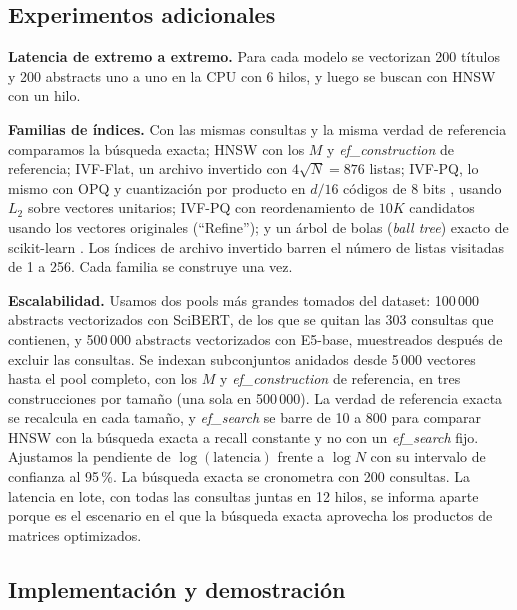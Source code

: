 \documentclass[runningheads]{llncs}
\newcommand{\efc}{\textit{ef\_construction}}
\newcommand{\efs}{\textit{ef\_search}}
\begin{document}
\subsection{Experimentos adicionales}

\textbf{Latencia de extremo a extremo.} Para cada modelo se vectorizan 200 títulos y 200
abstracts uno a uno en la CPU con 6 hilos, y luego se buscan con HNSW con un hilo.

\textbf{Familias de índices.} Con las mismas consultas y la misma verdad de referencia
comparamos la búsqueda exacta; HNSW con los $M$ y \efc{} de referencia; IVF-Flat, un archivo
invertido con $4\sqrt{N}=876$ listas; IVF-PQ, lo mismo con OPQ y cuantización por producto en
$d/16$ códigos de 8 bits \cite{ref15,ge2014}, usando $L_2$ sobre vectores unitarios; IVF-PQ
con reordenamiento de $10K$ candidatos usando los vectores originales (``Refine''); y un
árbol de bolas (\textit{ball tree}) exacto de scikit-learn \cite{omohundro1989}. Los índices
de archivo invertido barren el número de listas visitadas de 1 a 256. Cada familia se
construye una vez.

\textbf{Escalabilidad.} Usamos dos pools más grandes tomados del dataset: 100\,000 abstracts
vectorizados con SciBERT, de los que se quitan las 303 consultas que contienen, y 500\,000
abstracts vectorizados con E5-base, muestreados después de excluir las consultas. Se indexan
subconjuntos anidados desde 5\,000 vectores hasta el pool completo, con los $M$ y \efc{} de
referencia, en tres construcciones por tamaño (una sola en 500\,000). La verdad de referencia
exacta se recalcula en cada tamaño, y \efs{} se barre de 10 a 800 para comparar HNSW con la
búsqueda exacta a recall constante y no con un \efs{} fijo. Ajustamos la pendiente de
$\log(\text{latencia})$ frente a $\log N$ con su intervalo de confianza al 95\,\%. La búsqueda
exacta se cronometra con 200 consultas. La latencia en lote, con todas las consultas juntas en
12 hilos, se informa aparte porque es el escenario en el que la búsqueda exacta aprovecha los
productos de matrices optimizados.

\subsection{Implementación y demostración}
\end{document}
